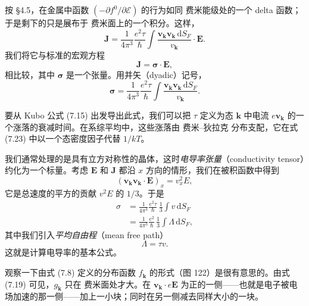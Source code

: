 按 §4.5，在金属中函数 $(-\partial f^{0}/\partial\mathcal{E})$ 的行为如同 费米能级处的一个 delta 函数；于是剩下的只是展布于 费米面上的一个积分。这样，
\begin{equation*}
\mathbf{J}=\frac{1}{4\pi^{3}}\frac{e^{2}\tau}{\hbar}\int\frac{\mathbf{v}_{\mathbf{k}}\mathbf{v}_{\mathbf{k}}\,\mathrm{d}S_{F}}{v_{\mathbf{k}}}\cdot\mathbf{E}.\tag{7.21}
\end{equation*}
我们将它与标准的宏观方程
\begin{equation*}
\mathbf{J}=\boldsymbol{\sigma}\cdot\mathbf{E},\tag{7.22}
\end{equation*}
相比较，其中 $\boldsymbol{\sigma}$ 是一个张量。用并矢（dyadic）记号，
\begin{equation*}
\boldsymbol{\sigma}=\frac{1}{4\pi^{3}}\frac{e^{2}\tau}{\hbar}\int\frac{\mathbf{v}_{\mathbf{k}}\mathbf{v}_{\mathbf{k}}\,\mathrm{d}S_{F}}{v_{\mathbf{k}}}.\tag{7.23}
\end{equation*}

要从 Kubo 公式 (7.15) 出发导出此式，我们可以把 $\tau$ 定义为态 $\mathbf{k}$ 中电流 $e\mathbf{v}_{\mathbf{k}}$ 的一个涨落的衰减时间。在系综平均中，这些涨落由 费米–狄拉克 分布支配，它在式 (7.23) 中以一个态密度因子代替 $1/kT$。

我们通常处理的是具有立方对称性的晶体，这时\emph{电导率张量}（conductivity tensor）约化为一个标量。考虑 $\mathbf{E}$ 和 $\mathbf{J}$ 都沿 $x$ 方向的情形，我们在被积函数中得到
\begin{equation*}
(\mathbf{v}_{\mathbf{k}}\mathbf{v}_{\mathbf{k}}\cdot\mathbf{E})_{x}=v_{x}^{2}E,\tag{7.24}
\end{equation*}
它是总速度的平方的贡献 $v^{2}E$ 的 $1/3$。于是
\begin{align*}
\sigma&=\frac{1}{4\pi^{3}}\frac{e^{2}\tau}{\hbar}\,\frac{1}{3}\int v\,\mathrm{d}S_{F}\\
&=\frac{1}{4\pi^{3}}\frac{e^{2}}{\hbar}\,\frac{1}{3}\int\Lambda\,\mathrm{d}S_{F},\tag{7.25}
\end{align*}
其中我们引入\emph{平均自由程}（mean free path）
\begin{equation*}
\Lambda=\tau v.\tag{7.26}
\end{equation*}
这就是计算电导率的基本公式。

观察一下由式 (7.8) 定义的分布函数 $f_{\mathbf{k}}$ 的形式（图 122）是很有意思的。由式 (7.19) 可见，$g_{\mathbf{k}}$ 只在 费米面处才大。在 $\mathbf{v}_{\mathbf{k}}\cdot e\mathbf{E}$ 为正的一侧——也就是电子被电场加速的那一侧——加上一小块；同时在另一侧减去同样大小的一块。

